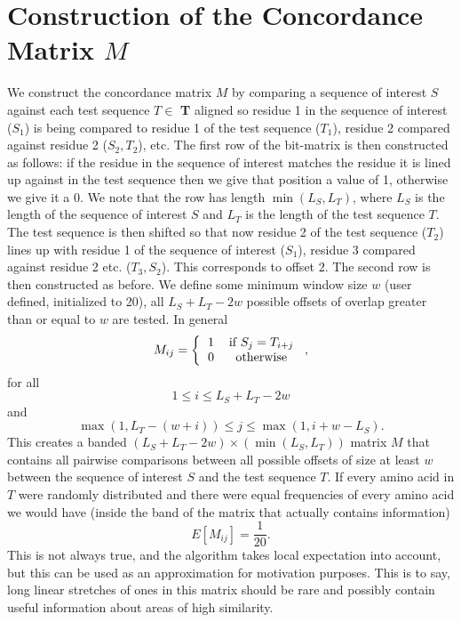 \documentclass[phd,tocprelim]{cornell}
\begin{document}
\section{Construction of the Concordance Matrix $M$}

We construct the concordance matrix $M$ by comparing a sequence of interest $S$ against each test sequence $T \in$ \textbf{T} aligned so residue 1 in the sequence of interest ($S_{1}$) is being compared to residue 1 of the test sequence ($T_{1}$), residue 2 compared against residue 2 ($S_{2},T_{2}$), etc. The first row of the bit-matrix is then constructed as follows: if the residue in the sequence of interest matches the residue it is lined up against in the test sequence then we give that position a value of 1, otherwise we give it a 0. We note that the row has length $\min(L_{S},L_{T})$, where $L_{S}$ is the length of the sequence of interest $S$ and $L_{T}$ is the length of the test sequence $T$. The test sequence is then shifted so that now residue 2 of the test sequence ($T_{2}$) lines up with residue 1 of the sequence of interest ($S_{1}$), residue 3 compared against residue 2 etc. ($T_{3},S_{2}$). This corresponds to offset 2. The second row is then constructed as before. We define some minimum window size $w$ (user defined, initialized to 20), all $L_{S} + L_{T}-2w$ possible offsets of overlap greater than or equal to $w$ are tested. In general
\begin{equation}
    M_{ij} = \left\{\begin{tabular}{cc} 1 & if $S_{j} = T_{i+j}$ \\ 0 & otherwise \end{tabular}\right.,
\end{equation}
for all
\begin{equation}
    1 \leq i \leq L_{S} + L_{T}-2w
\end{equation}
and
\begin{equation}
    \max(1,L_{T} - (w+i)) \leq j \leq \max(1,i+w-L_{S}).
\end{equation}
This creates a banded $(L_{S} + L_{T}-2w) \times (\min(L_{S},L_{T}))$ matrix $M$ that contains all pairwise comparisons between all possible offsets of size at least $w$ between the sequence of interest $S$ and the test sequence $T$. If every amino acid in $T$ were randomly distributed and there were equal frequencies of every amino acid we would have (inside the band of the matrix that actually contains information)
\begin{equation}
    E[M_{ij}] = \frac{1}{20}.
\end{equation}
This is not always true, and the algorithm takes local expectation into account, but this can be used as an approximation for motivation purposes. This is to say, long linear stretches of ones in this matrix should be rare and possibly contain useful information about areas of high similarity.
\end{document}
